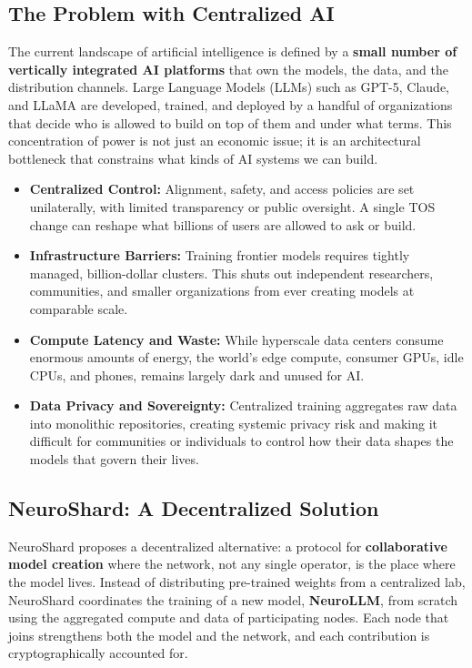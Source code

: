 \documentclass[11pt,a4paper]{article}
\begin{document}
\subsection{The Problem with Centralized AI}

The current landscape of artificial intelligence is defined by a \textbf{small number of vertically integrated AI platforms} that own the models, the data, and the distribution channels. Large Language Models (LLMs) such as GPT-5, Claude, and LLaMA are developed, trained, and deployed by a handful of organizations that decide who is allowed to build on top of them and under what terms. This concentration of power is not just an economic issue; it is an architectural bottleneck that constrains what kinds of AI systems we can build.

\begin{itemize}
    \item \textbf{Centralized Control:} Alignment, safety, and access policies are set unilaterally, with limited transparency or public oversight. A single TOS change can reshape what billions of users are allowed to ask or build.
    \item \textbf{Infrastructure Barriers:} Training frontier models requires tightly managed, billion-dollar clusters. This shuts out independent researchers, communities, and smaller organizations from ever creating models at comparable scale.
    \item \textbf{Compute Latency and Waste:} While hyperscale data centers consume enormous amounts of energy, the world's edge compute, consumer GPUs, idle CPUs, and phones, remains largely dark and unused for AI.
    \item \textbf{Data Privacy and Sovereignty:} Centralized training aggregates raw data into monolithic repositories, creating systemic privacy risk and making it difficult for communities or individuals to control how their data shapes the models that govern their lives.
\end{itemize}

\subsection{NeuroShard: A Decentralized Solution}

NeuroShard proposes a decentralized alternative: a protocol for \textbf{collaborative model creation} where the network, not any single operator, is the place where the model lives. Instead of distributing pre-trained weights from a centralized lab, NeuroShard coordinates the training of a new model, \textbf{NeuroLLM}, from scratch using the aggregated compute and data of participating nodes. Each node that joins strengthens both the model and the network, and each contribution is cryptographically accounted for.
\end{document}
